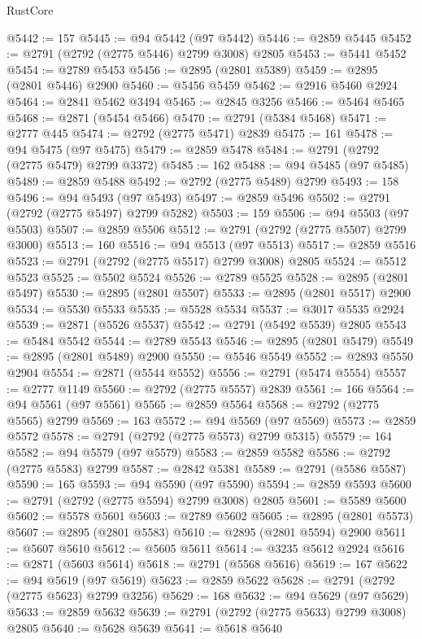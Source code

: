 \begin{lexlean}{RustCore}
\begin{coremodule}
@5442 := 157
@5445 := @94 @5442 (@97 @5442)
@5446 := @2859 @5445
@5452 := @2791 (@2792 (@2775 @5446) @2799 @3008) @2805
@5453 := @5441 @5452
@5454 := @2789 @5453
@5456 := @2895 (@2801 @5389)
@5459 := @2895 (@2801 @5446) @2900
@5460 := @5456 @5459
@5462 := @2916 @5460 @2924
@5464 := @2841 @5462 @3494
@5465 := @2845 @3256
@5466 := @5464 @5465
@5468 := @2871 (@5454 @5466)
@5470 := @2791 (@5384 @5468)
@5471 := @2777 @445
@5474 := @2792 (@2775 @5471) @2839
@5475 := 161
@5478 := @94 @5475 (@97 @5475)
@5479 := @2859 @5478
@5484 := @2791 (@2792 (@2775 @5479) @2799 @3372)
@5485 := 162
@5488 := @94 @5485 (@97 @5485)
@5489 := @2859 @5488
@5492 := @2792 (@2775 @5489) @2799
@5493 := 158
@5496 := @94 @5493 (@97 @5493)
@5497 := @2859 @5496
@5502 := @2791 (@2792 (@2775 @5497) @2799 @5282)
@5503 := 159
@5506 := @94 @5503 (@97 @5503)
@5507 := @2859 @5506
@5512 := @2791 (@2792 (@2775 @5507) @2799 @3000)
@5513 := 160
@5516 := @94 @5513 (@97 @5513)
@5517 := @2859 @5516
@5523 := @2791 (@2792 (@2775 @5517) @2799 @3008) @2805
@5524 := @5512 @5523
@5525 := @5502 @5524
@5526 := @2789 @5525
@5528 := @2895 (@2801 @5497)
@5530 := @2895 (@2801 @5507)
@5533 := @2895 (@2801 @5517) @2900
@5534 := @5530 @5533
@5535 := @5528 @5534
@5537 := @3017 @5535 @2924
@5539 := @2871 (@5526 @5537)
@5542 := @2791 (@5492 @5539) @2805
@5543 := @5484 @5542
@5544 := @2789 @5543
@5546 := @2895 (@2801 @5479)
@5549 := @2895 (@2801 @5489) @2900
@5550 := @5546 @5549
@5552 := @2893 @5550 @2904
@5554 := @2871 (@5544 @5552)
@5556 := @2791 (@5474 @5554)
@5557 := @2777 @1149
@5560 := @2792 (@2775 @5557) @2839
@5561 := 166
@5564 := @94 @5561 (@97 @5561)
@5565 := @2859 @5564
@5568 := @2792 (@2775 @5565) @2799
@5569 := 163
@5572 := @94 @5569 (@97 @5569)
@5573 := @2859 @5572
@5578 := @2791 (@2792 (@2775 @5573) @2799 @5315)
@5579 := 164
@5582 := @94 @5579 (@97 @5579)
@5583 := @2859 @5582
@5586 := @2792 (@2775 @5583) @2799
@5587 := @2842 @5381
@5589 := @2791 (@5586 @5587)
@5590 := 165
@5593 := @94 @5590 (@97 @5590)
@5594 := @2859 @5593
@5600 := @2791 (@2792 (@2775 @5594) @2799 @3008) @2805
@5601 := @5589 @5600
@5602 := @5578 @5601
@5603 := @2789 @5602
@5605 := @2895 (@2801 @5573)
@5607 := @2895 (@2801 @5583)
@5610 := @2895 (@2801 @5594) @2900
@5611 := @5607 @5610
@5612 := @5605 @5611
@5614 := @3235 @5612 @2924
@5616 := @2871 (@5603 @5614)
@5618 := @2791 (@5568 @5616)
@5619 := 167
@5622 := @94 @5619 (@97 @5619)
@5623 := @2859 @5622
@5628 := @2791 (@2792 (@2775 @5623) @2799 @3256)
@5629 := 168
@5632 := @94 @5629 (@97 @5629)
@5633 := @2859 @5632
@5639 := @2791 (@2792 (@2775 @5633) @2799 @3008) @2805
@5640 := @5628 @5639
@5641 := @5618 @5640

\end{coremodule}
\end{lexlean}
